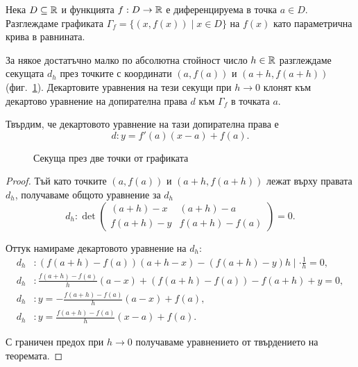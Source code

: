 \documentclass[numbers=endperiod, DIV=15, bibliography=totocnumbered]{scrartcl}
\begin{document}
\bigskip
\begin{minipage}{0.5\textwidth}
  \begin{theorem}
    Нека $D \subseteq \mathbb{R}$ и функцията $f: D \to \mathbb{R}$ е диференцируема в точка $a \in D$. Разглеждаме графиката $\Gamma_f = \{ (x, f(x)) \mid x \in D \}$ на $f(x)$ като параметрична крива в равнината.

    За някое достатъчно малко по абсолютна стойност число $h \in \mathbb{R}$ разглеждаме секущата $d_h$ през точките с координати $(a, f(a))$ и $(a+h, f(a+h))$ (фиг.~\ref{fig:secant}). Декартовите уравнения на тези секущи при $h \to 0$ клонят към декартово уравнение на допирателна права $d$ към $\Gamma_f$ в точката $a$.

    Твърдим, че декартовото уравнение на тази допирателна права е
    \begin{displaymath}
      d: y = f'(a) (x-a) + f(a).
    \end{displaymath}
  \end{theorem}
\end{minipage}
\hspace{1cm}
\begin{minipage}{0.45\textwidth}
  \begin{figure}[H]
    \begin{center}
    \end{center}
    \caption{Секуща през две точки от графиката}\label{fig:secant}
  \end{figure}
\end{minipage}
\begin{proof}
  Тъй като точките $(a, f(a))$ и $(a+h, f(a+h))$ лежат върху правата $d_h$, получаваме общото уравнение за $d_h$
    \begin{displaymath}
      d_h: \det \begin{pmatrix}
      (a+h)-x & (a+h)-a \\
      f(a+h)-y & f(a+h)-f(a)
    \end{pmatrix}
    = 0.
  \end{displaymath}

  Оттук намираме декартовото уравнение на $d_h$:
  \begin{align*}
    d_h&: (f(a+h) - f(a)) (a+h-x) - (f(a+h)-y)h \mid \cdot \frac 1 h = 0,
    \\
    d_h&: \frac {f(a+h) - f(a)} h (a-x) + (f(a+h) - f(a)) - f(a+h) + y = 0,
    \\
    d_h&: y = -\frac {f(a+h) - f(a)} h (a-x) + f(a),
    \\
    d_h&: y = \frac {f(a+h) - f(a)} h (x-a) + f(a).
  \end{align*}

  С граничен предох при $h \to 0$ получаваме уравнението от твърдението на теоремата.
\end{proof}
\end{document}
